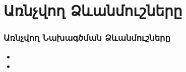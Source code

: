 \documentclass{beamer}
\begin{document}
\section{Առնչվող Ձևանմուշները}
\begin{frame}\frametitle{Առնչվող Նախագծման Ձևանմուշները}
\begin{itemize}
    \item \vfill 
    \item 
\end{itemize}
\end{frame}
\end{document}
